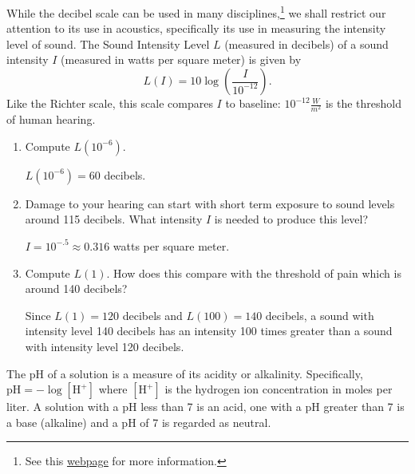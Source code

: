 \documentclass{ximera}
\begin{document}
\begin{question}
\begin{problem}
\end{problem}

\begin{problem}\label{decibelexercise}
While the decibel scale can be used in many disciplines,\footnote{See this  \href{http://en.wikipedia.org/wiki/Decibel}{\underline{webpage}} for more information.} we shall restrict our attention to its use in acoustics, specifically its use in measuring the intensity level of sound. The Sound Intensity Level $L$ (measured in decibels) of a sound intensity $I$ (measured in watts per square meter) is given by \[L(I) = 10\log\left( \dfrac{I}{10^{-12}} \right).\] Like the Richter scale, this scale compares $I$ to baseline: $10^{-12} \frac{W}{m^{2}}$ is the threshold of human hearing. 

\begin{enumerate}

\item Compute $L(10^{-6})$.

\begin{solution}
$L(10^{-6}) = 60$ decibels.
\end{solution}

\item Damage to your hearing can start with short term exposure to sound levels around 115 decibels.  What intensity $I$ is needed to produce this level? 

\begin{solution}
$I = 10^{-.5} \approx 0.316$ watts per square meter.
\end{solution}

\item Compute $L(1)$.  How does this compare with the threshold of pain which is around 140 decibels?

\begin{solution}
Since $L(1) = 120$ decibels and $L(100) = 140$ decibels, a sound with intensity level 140 decibels has an intensity 100 times greater than a sound with intensity level 120 decibels.
\end{solution}

\end{enumerate}
\end{problem}

\begin{problem}\label{pHexercise}
The pH of a solution is a measure of its acidity or alkalinity.  Specifically, $\mbox{pH} = -\log[\mbox{H}^{+}]$ where $[\mbox{H}^{+}]$ is the hydrogen ion concentration in moles per liter.  A solution with a pH less than 7 is an acid, one with a pH greater than 7 is a base (alkaline) and a pH of 7 is regarded as neutral.


\end{problem}
\end{question}
\end{document}

